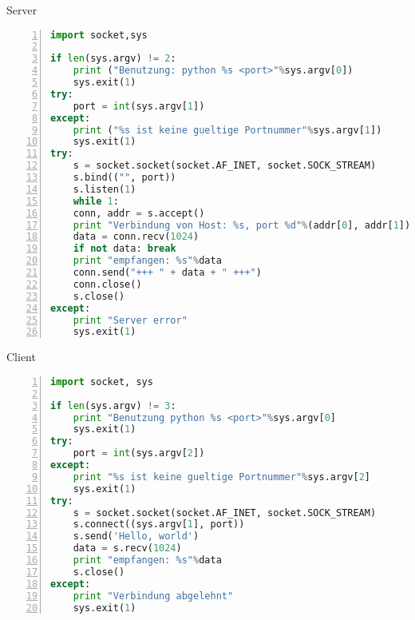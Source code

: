 \documentclass[fleqn]{article}
\begin{document}
\begin{center}
    Server
\end{center}
\begin{lstlisting}[language = Python, numbers=left, 
    numberstyle=\tiny,keywordstyle=\color{blue!70},
    commentstyle=\color{red!50!green!50!blue!50},frame=shadowbox,
    rulesepcolor=\color{red!20!green!20!blue!20},basicstyle=\ttfamily]
import socket,sys

if len(sys.argv) != 2:
    print ("Benutzung: python %s <port>"%sys.argv[0])
    sys.exit(1)
try:
    port = int(sys.argv[1])
except:
    print ("%s ist keine gueltige Portnummer"%sys.argv[1])
    sys.exit(1)
try:
    s = socket.socket(socket.AF_INET, socket.SOCK_STREAM)
    s.bind(("", port))
    s.listen(1)
    while 1:
    conn, addr = s.accept()
    print "Verbindung von Host: %s, port %d"%(addr[0], addr[1])
    data = conn.recv(1024)
    if not data: break
    print "empfangen: %s"%data
    conn.send("+++ " + data + " +++")
    conn.close()
    s.close()
except:
    print "Server error"
    sys.exit(1)
\end{lstlisting}

\begin{center}
    Client
\end{center}
\begin{lstlisting}[language = Python, numbers=left, 
    numberstyle=\tiny,keywordstyle=\color{blue!70},
    commentstyle=\color{red!50!green!50!blue!50},frame=shadowbox,
    rulesepcolor=\color{red!20!green!20!blue!20},basicstyle=\ttfamily]
import socket, sys

if len(sys.argv) != 3:
    print "Benutzung python %s <port>"%sys.argv[0]
    sys.exit(1)
try:
    port = int(sys.argv[2])
except:
    print "%s ist keine gueltige Portnummer"%sys.argv[2]
    sys.exit(1)
try:
    s = socket.socket(socket.AF_INET, socket.SOCK_STREAM)
    s.connect((sys.argv[1], port))
    s.send('Hello, world')
    data = s.recv(1024)
    print "empfangen: %s"%data
    s.close()
except:
    print "Verbindung abgelehnt"
    sys.exit(1)
\end{lstlisting}

\clearpage
\end{document}
